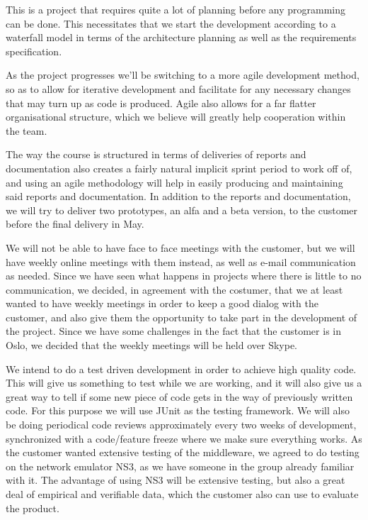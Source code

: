 \documentclass[12pt]{article}
\begin{document}
    This is a project that requires quite a lot of planning before any programming can be done. This necessitates that we start the development according to a waterfall model in terms of the architecture planning as well as the requirements specification.
    
    As the project progresses we’ll be switching to a more agile development method, so as to allow for iterative development and facilitate for any necessary changes that may turn up as code is produced. Agile also allows for a far flatter organisational structure, which we believe will greatly help cooperation within the team.
    
    The way the course is structured in terms of deliveries of reports and documentation also creates a fairly natural implicit sprint period to work off of, and using an agile methodology will help in easily producing and maintaining said reports and documentation. In addition to the  reports and documentation, we will try to deliver two prototypes, an alfa and a beta version, to the customer before the final delivery in May.

    We will not be able to have face to face meetings with the customer, but we will have weekly online meetings with them instead, as well as e-mail communication as needed. Since we have seen what happens in projects where there is little to no communication, we decided, in agreement with the costumer, that we at least wanted to have weekly meetings in order  to keep a good dialog with the customer, and also give them the opportunity to take part in the development of the project. Since we have some challenges in the fact that the customer is in Oslo, we decided that the weekly meetings will be held over Skype.

    We  intend to do a test driven development in order to achieve high quality code. This will give us something to test while we are working, and it will also give us a great way to tell if some new piece of code gets in the way of previously written code. For this purpose we will use JUnit as the testing framework. We will also be doing periodical code reviews approximately every two weeks of development, synchronized with a code/feature freeze where we make sure everything works. As the customer wanted extensive testing of the middleware, we agreed to do testing on the network emulator NS3, as we have someone in the group already familiar with it. The advantage of using NS3 will be extensive testing, but also a great deal of empirical and verifiable data, which the customer also can use to evaluate the product.
\end{document}
